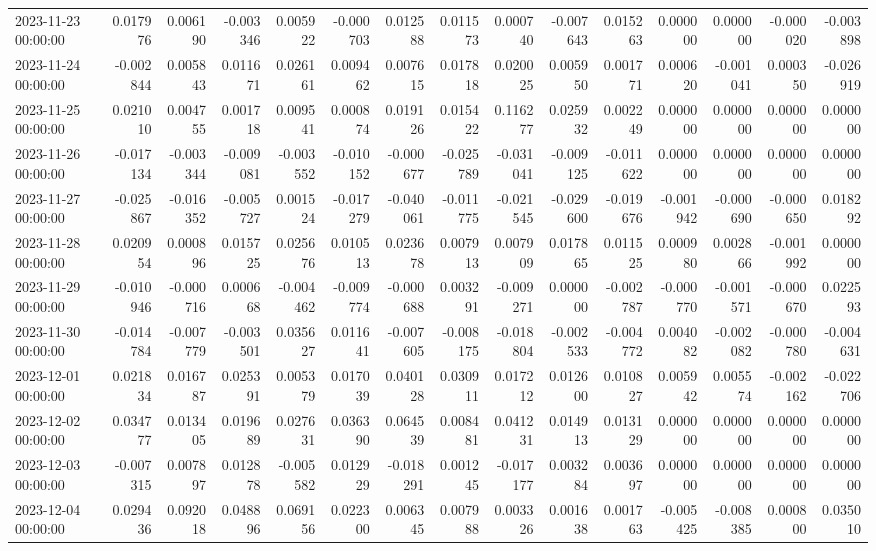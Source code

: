 \begin{tabular}{lrrrrrrrrrrrrrr}
2023-11-23 00:00:00 & 0.017976 & 0.006190 & -0.003346 & 0.005922 & -0.000703 & 0.012588 & 0.011573 & 0.000740 & -0.007643 & 0.015263 & 0.000000 & 0.000000 & -0.000020 & -0.003898 \\
2023-11-24 00:00:00 & -0.002844 & 0.005843 & 0.011671 & 0.026161 & 0.009462 & 0.007615 & 0.017818 & 0.020025 & 0.005950 & 0.001771 & 0.000620 & -0.001041 & 0.000350 & -0.026919 \\
2023-11-25 00:00:00 & 0.021010 & 0.004755 & 0.001718 & 0.009541 & 0.000874 & 0.019126 & 0.015422 & 0.116277 & 0.025932 & 0.002249 & 0.000000 & 0.000000 & 0.000000 & 0.000000 \\
2023-11-26 00:00:00 & -0.017134 & -0.003344 & -0.009081 & -0.003552 & -0.010152 & -0.000677 & -0.025789 & -0.031041 & -0.009125 & -0.011622 & 0.000000 & 0.000000 & 0.000000 & 0.000000 \\
2023-11-27 00:00:00 & -0.025867 & -0.016352 & -0.005727 & 0.001524 & -0.017279 & -0.040061 & -0.011775 & -0.021545 & -0.029600 & -0.019676 & -0.001942 & -0.000690 & -0.000650 & 0.018292 \\
2023-11-28 00:00:00 & 0.020954 & 0.000896 & 0.015725 & 0.025676 & 0.010513 & 0.023678 & 0.007913 & 0.007909 & 0.017865 & 0.011525 & 0.000980 & 0.002866 & -0.001992 & 0.000000 \\
2023-11-29 00:00:00 & -0.010946 & -0.000716 & 0.000668 & -0.004462 & -0.009774 & -0.000688 & 0.003291 & -0.009271 & 0.000000 & -0.002787 & -0.000770 & -0.001571 & -0.000670 & 0.022593 \\
2023-11-30 00:00:00 & -0.014784 & -0.007779 & -0.003501 & 0.035627 & 0.011641 & -0.007605 & -0.008175 & -0.018804 & -0.002533 & -0.004772 & 0.004082 & -0.002082 & -0.000780 & -0.004631 \\
2023-12-01 00:00:00 & 0.021834 & 0.016787 & 0.025391 & 0.005379 & 0.017039 & 0.040128 & 0.030911 & 0.017212 & 0.012600 & 0.010827 & 0.005942 & 0.005574 & -0.002162 & -0.022706 \\
2023-12-02 00:00:00 & 0.034777 & 0.013405 & 0.019689 & 0.027631 & 0.036390 & 0.064539 & 0.008481 & 0.041231 & 0.014913 & 0.013129 & 0.000000 & 0.000000 & 0.000000 & 0.000000 \\
2023-12-03 00:00:00 & -0.007315 & 0.007897 & 0.012878 & -0.005582 & 0.012929 & -0.018291 & 0.001245 & -0.017177 & 0.003284 & 0.003697 & 0.000000 & 0.000000 & 0.000000 & 0.000000 \\
2023-12-04 00:00:00 & 0.029436 & 0.092018 & 0.048896 & 0.069156 & 0.022300 & 0.006345 & 0.007988 & 0.003326 & 0.001638 & 0.001763 & -0.005425 & -0.008385 & 0.000800 & 0.035010 \\

\end{tabular}
